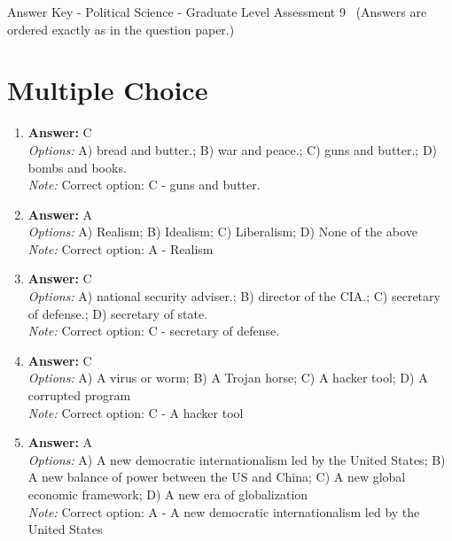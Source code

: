 \documentclass[12pt]{article}
\begin{document}
\begin{center}
Answer Key - Political Science - Graduate Level Assessment 9 \
\small (Answers are ordered exactly as in the question paper.)
\end{center}

\section*{Multiple Choice}
\begin{enumerate}[label=\arabic*.]
\item \textbf{Answer:} C
\\ \textit{Options:} A) bread and butter.; B) war and peace.; C) guns and butter.; D) bombs and books.
\\ \textit{Note:} Correct option: C - guns and butter.
\item \textbf{Answer:} A
\\ \textit{Options:} A) Realism; B) Idealism; C) Liberalism; D) None of the above
\\ \textit{Note:} Correct option: A - Realism
\item \textbf{Answer:} C
\\ \textit{Options:} A) national security adviser.; B) director of the CIA.; C) secretary of defense.; D) secretary of state.
\\ \textit{Note:} Correct option: C - secretary of defense.
\item \textbf{Answer:} C
\\ \textit{Options:} A) A virus or worm; B) A Trojan horse; C) A hacker tool; D) A corrupted program
\\ \textit{Note:} Correct option: C - A hacker tool
\item \textbf{Answer:} A
\\ \textit{Options:} A) A new democratic internationalism led by the United States; B) A new balance of power between the US and China; C) A new global economic framework; D) A new era of globalization
\\ \textit{Note:} Correct option: A - A new democratic internationalism led by the United States
\end{enumerate}
\end{document}
